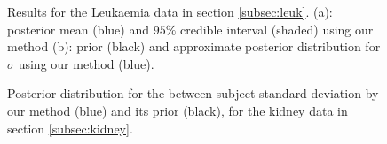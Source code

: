 \documentclass[ba]{imsart}
\begin{document}
\begin{figure}[ht]
\centering
{}
\caption{Results for the Leukaemia data in section \ref{subsec:leuk}. (a): posterior mean (blue) and $95\%$ credible interval (shaded) using our method (b): prior (black) and approximate posterior distribution for $\sigma$ using our method (blue).}
\label{fig:leuk}
\end{figure}

\begin{figure}[ht]
\centering
{}
\caption{Posterior distribution for the between-subject standard deviation by our method (blue) and its prior (black), for the kidney data in section \ref{subsec:kidney}.}
\label{fig:BetweenSubjectSD}
\end{figure}
\end{document}
